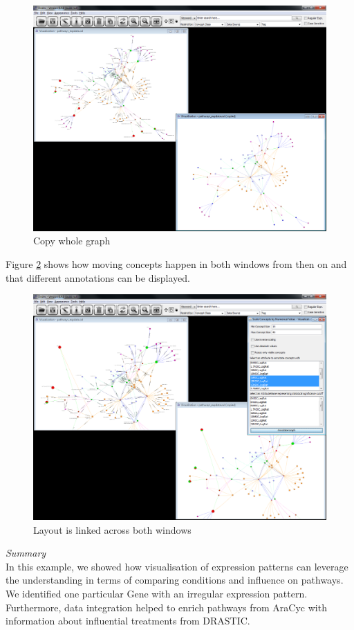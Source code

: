 \begin{figure}[H]
\centering
\includegraphics[scale=0.35]{images/Oct12/app1fig12.png} 
\caption{Copy whole graph}
\label{fig:copygraph}
\end{figure}

Figure \ref{fig:clone} shows how moving concepts happen in both windows from then on
and that different annotations can be displayed.

\begin{figure}[H]
\centering
\includegraphics[scale=0.35]{images/Oct12/app1fig13.png} 
\caption{Layout is linked across both windows}
\label{fig:clone}
\end{figure}

{\em{Summary}}\\
In this example, we showed how visualisation of expression patterns can leverage the understanding 
in terms of comparing conditions and influence on pathways. We identified one particular Gene with an irregular expression pattern. 
Furthermore, data integration helped to enrich pathways from AraCyc with information about influential treatments from DRASTIC. 